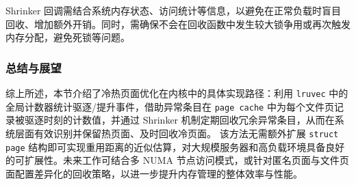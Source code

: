 Shrinker 回调需结合系统内存状态、访问统计等信息，以避免在正常负载时盲目回收、增加额外开销。同时，需确保不会在回收函数中发生较大锁争用或再次触发内存分配，避免死锁等问题。

\subsubsection{总结与展望}

综上所述，本节介绍了冷热页面优化在内核中的具体实现路径：利用 \texttt{lruvec} 中的全局计数器统计驱逐/提升事件，借助异常条目在 \texttt{page cache} 中为每个文件页记录被驱逐时刻的计数值，并通过 Shrinker 机制定期回收冗余异常条目，从而在系统层面有效识别并保留热页面、及时回收冷页面。  
该方法无需额外扩展 \texttt{struct page} 结构即可实现重用距离的近似估算，对大规模服务器和高负载环境具备良好的可扩展性。未来工作可结合多 NUMA 节点访问模式，或针对匿名页面与文件页面配置差异化的回收策略，以进一步提升内存管理的整体效率与性能。
